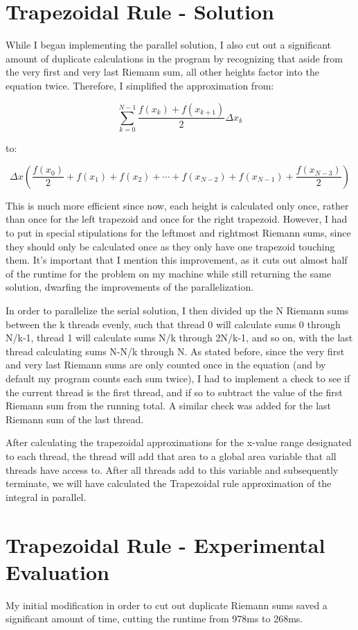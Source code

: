\documentclass[a4paper]{article}
\begin{document}
\section{Trapezoidal Rule - Solution}

While I began implementing the parallel solution, I also cut out a significant amount of duplicate calculations in the program by recognizing that aside from the very first and very last Riemann sum, all other heights factor into the equation twice. Therefore, I simplified the approximation from:

\[ \sum_{k=0}^{N-1} \frac{f(x_k) + f(x_{k+1})}{2} \Delta x_k \]

\noindent
to:

\[ \Delta x (\frac{f(x_0)}{2} + f(x_1) + f(x_2) + \cdots + f(x_{N-2}) + f(x_{N-1}) + \frac{f(x_{N-3})}{2} )\]

\noindent
This is much more efficient since now, each height is calculated only once, rather than once for the left trapezoid and once for the right trapezoid. However, I had to put in special stipulations for the leftmost and rightmost Riemann sums, since they should only be calculated once as they only have one trapezoid touching them. It's important that I mention this improvement, as it cuts out almost half of the runtime for the problem on my machine while still returning the same solution, dwarfing the improvements of the parallelization.

In order to parallelize the serial solution, I then divided up the N Riemann sums between the k threads evenly, such that thread 0 will calculate sums 0 through N/k-1, thread 1 will calculate sums N/k through 2N/k-1, and so on, with the last thread calculating sums N-N/k through N. As stated before, since the very first and very last Riemann sums are only counted once in the equation (and by default my program counts each sum twice), I had to implement a check to see if the current thread is the first thread, and if so to subtract the value of the first Riemann sum from the running total. A similar check was added for the last Riemann sum of the last thread.

After calculating the trapezoidal approximations for the x-value range designated to each thread, the thread will add that area to a global area variable that all threads have access to. After all threads add to this variable and subsequently terminate, we will have calculated the Trapezoidal rule approximation of the integral in parallel.

\section{Trapezoidal Rule - Experimental Evaluation}
My initial modification in order to cut out duplicate Riemann sums saved a significant amount of time, cutting the runtime from 978ms to 268ms.
\end{document}
